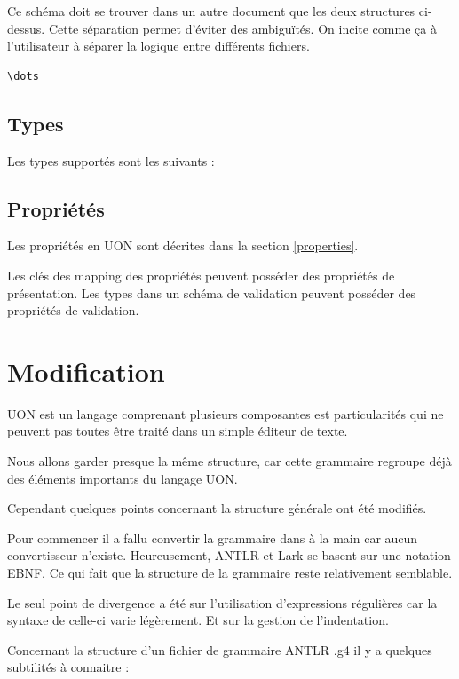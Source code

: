 \documentclass[
    iict, %
    il, %
]{heig-tb}
\begin{document}
Ce schéma doit se trouver dans un autre document que les deux structures ci-dessus.
Cette séparation permet d'éviter des ambiguïtés. On incite comme ça à l'utilisateur à séparer la logique entre différents fichiers.

\begin{lstlisting}[frame=single,caption={Exemple d'un schéma de validation},captionpos=b,label={yaml-seq}]
    \dots
\end{lstlisting}

\subsection{Types}
Les types supportés sont les suivants :

\subsection{Propriétés}

Les propriétés en UON sont décrites dans la section \ref{properties}.

Les clés des mapping des propriétés peuvent posséder des propriétés de présentation.
Les types dans un schéma de validation peuvent posséder des propriétés de validation.

\section{Modification}\label{modification}

UON est un langage comprenant plusieurs composantes est particularités qui ne peuvent pas toutes être traité dans un simple éditeur de texte.

Nous allons garder presque la même structure, car cette grammaire regroupe déjà des éléments importants du langage UON.

Cependant quelques points concernant la structure générale ont été modifiés.

Pour commencer il a fallu convertir la grammaire dans à la main car aucun convertisseur n'existe. Heureusement, ANTLR et Lark se basent sur une notation EBNF.
Ce qui fait que la structure de la grammaire reste relativement semblable.

Le seul point de divergence a été sur l'utilisation d'expressions régulières car la syntaxe de celle-ci varie légèrement. Et sur la gestion de l'indentation.

Concernant la structure d'un fichier de grammaire ANTLR .g4 il y a quelques subtilités à connaitre :
\end{document}
